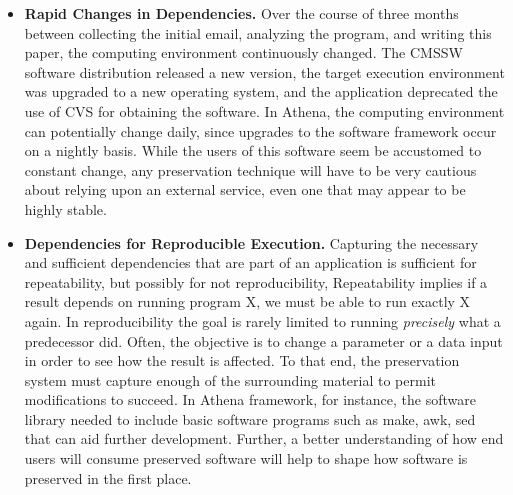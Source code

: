 \begin{itemize}
\item {\bf Rapid Changes in Dependencies.}  Over the course of three months
between collecting the initial email, analyzing the program, and writing this
paper, the computing environment continuously changed.  The CMSSW software
distribution released a new version, the target execution environment was upgraded
to a new operating system, and the application deprecated the use of CVS for obtaining
the software. In Athena, the computing environment can potentially change daily, since upgrades to the software framework occur on a nightly basis.  
While the users of this software seem be accustomed to constant change,
any preservation technique will have to be very cautious about relying upon an
external service, even one that may appear to be highly stable.

\item {\bf Dependencies for Reproducible Execution.} Capturing the necessary and sufficient dependencies that are part of an application is sufficient for repeatability, but possibly for not reproducibility, 
Repeatability implies if a result depends on running program X, we must be able to run exactly X again. In reproducibility the goal is rarely limited to running
\emph{precisely} what a predecessor did. Often, the objective is to
change a parameter or a data input in order to see how the result is affected. To that end, the preservation system must capture enough of the surrounding
material to permit modifications to succeed. In Athena framework, for instance, the software library needed to include basic software programs such as make, awk, sed that can aid further development.  
Further, a better understanding of how end users will consume preserved software will help to shape how
software is preserved in the first place.
\end{itemize}


